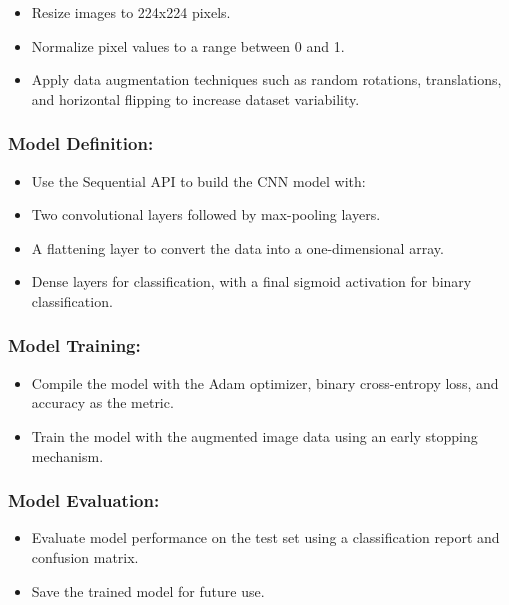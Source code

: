 \documentclass[11pt]{article}
\providecommand{\tightlist}{%
      \setlength{\itemsep}{0pt}\setlength{\parskip}{0pt}}
\begin{document}
\begin{itemize}
\tightlist
\item
  Resize images to 224x224 pixels.
\item
  Normalize pixel values to a range between 0 and 1.
\item
  Apply data augmentation techniques such as random rotations,
  translations, and horizontal flipping to increase dataset variability.
\end{itemize}

\subsubsection*{Model Definition:}\label{model-definition}

\begin{itemize}
\tightlist
\item
  Use the Sequential API to build the CNN model with:
\item
  Two convolutional layers followed by max-pooling layers.
\item
  A flattening layer to convert the data into a one-dimensional array.
\item
  Dense layers for classification, with a final sigmoid activation for
  binary classification.
\end{itemize}

\subsubsection*{Model Training:}\label{model-training}

\begin{itemize}
\tightlist
\item
  Compile the model with the Adam optimizer, binary cross-entropy loss,
  and accuracy as the metric.
\item
  Train the model with the augmented image data using an early stopping
  mechanism.
\end{itemize}

\subsubsection*{Model Evaluation:}\label{model-evaluation}

\begin{itemize}
\tightlist
\item
  Evaluate model performance on the test set using a classification
  report and confusion matrix.
\item
  Save the trained model for future use.
\end{itemize}
\end{document}
